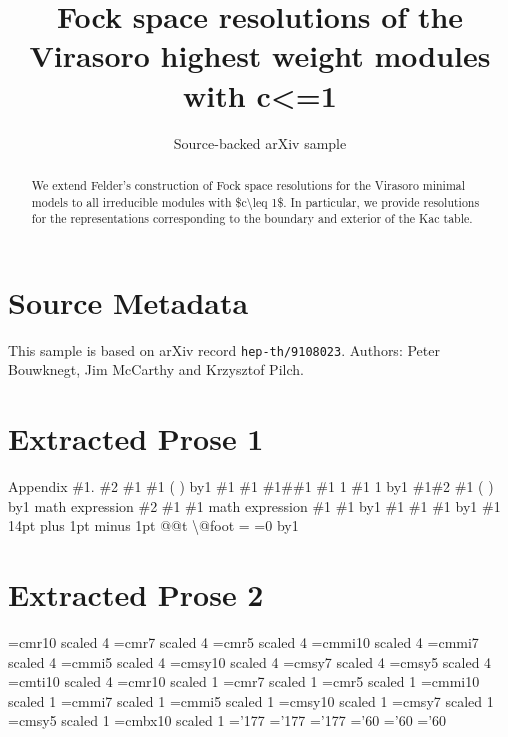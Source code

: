 \documentclass[11pt]{article}
\title{Fock space resolutions of the Virasoro highest weight modules with c<=1}
\author{Source-backed arXiv sample}
\date{}
\begin{document}
\maketitle
\begin{abstract}
We extend Felder's construction of Fock space resolutions for the Virasoro minimal models to all irreducible modules with \$c\textbackslash{}leq 1\$. In particular, we provide resolutions for the representations corresponding to the boundary and exterior of the Kac table.
\end{abstract}
\section{Source Metadata}
This sample is based on arXiv record \texttt{hep-th/9108023}. Authors: Peter Bouwknegt, Jim McCarthy and Krzysztof Pilch.
\section{Extracted Prose 1}
Appendix \#1. \#2 \#1 \#1 ( ) by1 \#1 \#1 \#1\#\#1 \#1 1 \#1 1 by1 \#1\#2 \#1 ( ) by1 math expression \#2 \#1 \#1 math expression \#1 \#1 by1 \#1 \#1 \#1 by1 \#1 14pt plus 1pt minus 1pt @@t \textbackslash{}@foot = =0 by1
\section{Extracted Prose 2}
=cmr10 scaled 4 =cmr7 scaled 4 =cmr5 scaled 4 =cmmi10 scaled 4 =cmmi7 scaled 4 =cmmi5 scaled 4 =cmsy10 scaled 4 =cmsy7 scaled 4 =cmsy5 scaled 4 =cmti10 scaled 4 =cmr10 scaled 1 =cmr7 scaled 1 =cmr5 scaled 1 =cmmi10 scaled 1 =cmmi7 scaled 1 =cmmi5 scaled 1 =cmsy10 scaled 1 =cmsy7 scaled 1 =cmsy5 scaled 1 =cmbx10 scaled 1 ='177 ='177 ='177 ='60 ='60 ='60
\end{document}

